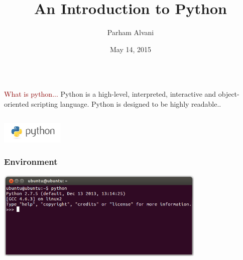 \documentclass{beamer}
\title[Introduction]{An Introduction to Python}
\author{Parham Alvani}
\institute[AUT] {
  Amirkabir University of Technology \\
  \medskip
  {\small\tt parham.alvani@gmail.com}
}
\date{May 14, 2015}
\begin{document}
\begin{frame}
\titlepage
\end{frame}


\section{}
\subsection{}

\begin{frame}
\begin{columns}
	\begin{column}{10cm}
		\vspace{2cm}
		\begin{block}{
				\centering\textcolor{darkred}{What is python...}}
				\justifying
				Python is a high-level, interpreted, interactive and object-oriented scripting language. Python is designed to be highly readable..\\
		\end{block}
	\end{column}
\end{columns}
\vspace{.75cm}
\hspace*{8.5cm}\includegraphics[width=3cm]{figs/python.jpeg}
\end{frame}

\begin{frame}
	\frametitle{Environment}
	\hspace*{1.5cm}\includegraphics[width=10cm]{figs/python-console-linux.png}
\end{frame}
\end{document}

